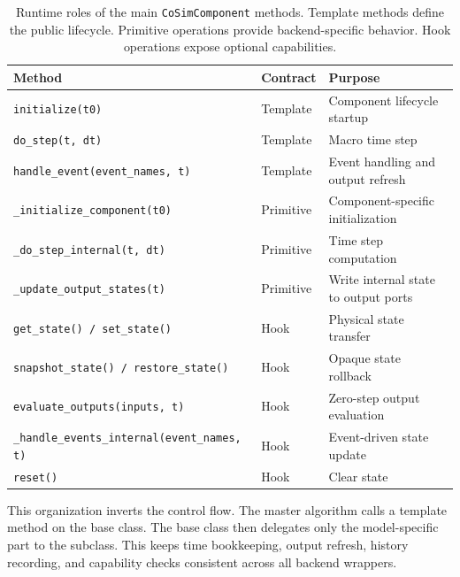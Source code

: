 %
\begin{table}[!htbp]
  \centering
  \small
  \caption[Runtime roles of the \texttt{CoSimComponent} methods]{Runtime roles of the main \texttt{CoSimComponent} methods.
  Template methods define the public lifecycle.
  Primitive operations provide backend-specific behavior.
  Hook operations expose optional capabilities.}
  \label{tab:component_methods}
  \begin{tabular}{llp{5.8cm}}
    \toprule
    \textbf{Method} & \textbf{Contract} & \textbf{Purpose} \\
    \midrule
    \texttt{initialize(t0)}                              & Template  & Component lifecycle startup \\
    \texttt{do\_step(t, dt)}                             & Template  & Macro time step \\
    \texttt{handle\_event(event\_names, t)}              & Template  & Event handling and output refresh \\
    \midrule
    \texttt{\_initialize\_component(t0)}                 & Primitive & Component-specific initialization \\
    \texttt{\_do\_step\_internal(t, dt)}                 & Primitive & Time step computation \\
    \texttt{\_update\_output\_states(t)}                 & Primitive & Write internal state to output ports \\
    \midrule
    \texttt{get\_state() / set\_state()}                 & Hook      & Physical state transfer \\
    \texttt{snapshot\_state() / restore\_state()}        & Hook      & Opaque state rollback \\
    \texttt{evaluate\_outputs(inputs, t)}                & Hook      & Zero-step output evaluation \\
    \texttt{\_handle\_events\_internal(event\_names, t)} & Hook      & Event-driven state update \\
    \texttt{reset()}                                     & Hook      & Clear state \\
    \bottomrule
  \end{tabular}
\end{table}

This organization inverts the control flow.
The master algorithm calls a template method on the base class.
The base class then delegates only the model-specific part to the subclass.
This keeps time bookkeeping, output refresh, history recording, and capability checks consistent across all backend wrappers.


